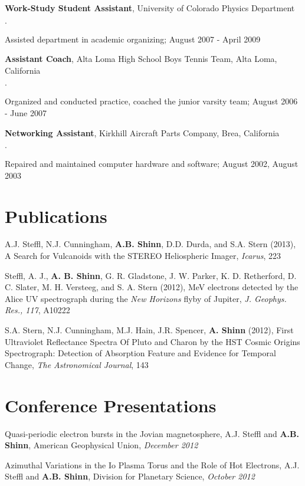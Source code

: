 \documentclass[margin,line]{res}
\newenvironment{list2}{
  \begin{list}{$\cdot$}{%
      \setlength{\itemsep}{0in}
      \setlength{\parsep}{0in} \setlength{\parskip}{0in}
      \setlength{\topsep}{0in} \setlength{\partopsep}{0in} 
      \setlength{\leftmargin}{0.2in}}}{\end{list}}
\begin{document}
\begin{resume}
{\bf Work-Study Student Assistant}, University of Colorado Physics Department
\begin{list2}
\item Assisted department in academic organizing; August 2007 - April 2009
\end{list2}

{\bf Assistant Coach}, Alta Loma High School Boys Tennis Team, Alta Loma, California
\begin{list2}
\item Organized and conducted practice, coached the junior varsity team; August 2006 - June 2007
\end{list2}

{\bf Networking Assistant}, Kirkhill Aircraft Parts Company, Brea, California
\begin{list2}
\item Repaired and maintained computer hardware and software; August 2002, August 2003
\end{list2}

\section{\sc Publications}
A.J. Steffl, N.J. Cunningham, {\bf A.B. Shinn}, D.D. Durda, and S.A. Stern (2013), A Search for Vulcanoids with the STEREO Heliospheric Imager, {\em Icarus}, 223

Steffl, A. J., {\bf A. B. Shinn}, G. R. Gladstone, J. W. Parker, K. D. Retherford, D. C. Slater, M. H. Versteeg, and S. A. Stern (2012), MeV electrons detected by the Alice UV spectrograph during the {\em New Horizons} flyby of Jupiter, {\em J. Geophys. Res., 117}, A10222%

S.A. Stern, N.J. Cunningham, M.J. Hain, J.R. Spencer, {\bf A. Shinn} (2012), First Ultraviolet Reflectance Spectra Of Pluto and Charon by the HST Cosmic Origins Spectrograph: Detection of Absorption Feature and Evidence for Temporal Change, {\em The Astronomical Journal}, 143


\section{\sc Conference Presentations}
Quasi-periodic electron bursts in the Jovian magnetosphere, A.J. Steffl and {\bf A.B. Shinn}, American Geophysical Union, {\it December 2012}

Azimuthal Variations in the Io Plasma Torus and the Role of Hot Electrons, A.J. Steffl and {\bf A.B. Shinn}, Division for Planetary Science, {\it October 2012}


\end{resume}
\end{document}
